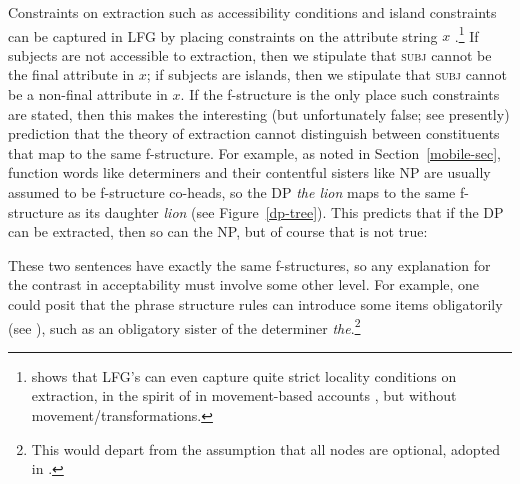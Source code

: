 \begin{sloppypar} 
Constraints on extraction such as accessibility conditions and island constraints  can be captured in LFG by placing constraints on the attribute string \ensuremath{x} \citep[Chapter~17]{dalrymple;ea19}.\footnote{\citet{asudeh-lpr} shows that LFG's  \citep[225--230]{dalrymple;ea19} can even capture quite strict locality conditions on extraction, in the spirit of  in movement-based accounts \citep{Chomsky73a,Chomsky77a-u}, but without movement/transformations.} If subjects are not accessible to extraction, then we stipulate that \textsc{subj} cannot be the final attribute in \ensuremath{x}; if subjects are islands, then we stipulate that \textsc{subj} cannot be a non-final attribute in \ensuremath{x}.  If the f-structure is the only place such constraints are stated, then 
this makes the interesting (but unfortunately false; see presently) prediction that the theory of extraction cannot distinguish between constituents that map to the same f-structure.  For example, as noted in Section~\ref{mobile-sec}, function words like determiners and their contentful sisters like NP are usually assumed to be f-structure co-heads, so the DP \textit{the lion} maps to the same f-structure as its daughter \textit{lion} (see  Figure~\ref{dp-tree}).  This predicts that if the DP can be extracted, then so can the NP, but of course that is not true:
\end{sloppypar}

\begin{exe} 
\ex	\label{nope}
\begin{xlist}
\end{xlist}
\end{exe}
\largerpage
These two sentences have exactly the same f-structures, so any explanation for the contrast in acceptability must involve some other level.  For example, one could posit that the phrase structure rules can introduce some items obligatorily (see \citealt[239]{snijders15}), such as an obligatory sister of the determiner \textit{the}.\footnote{This would depart from the assumption that all nodes are optional, adopted in \citet{BATW2016a}.} 


